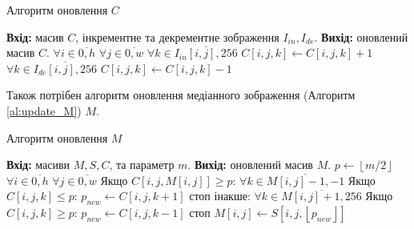 \begin{algorithm}[H]
    \caption{Алгоритм оновлення $C$}
    \begin{algorithmic}
        \State \textbf{Вхід:} масив $C$, інкрементне та декрементне зображення $I_{in}, I_{de}$.
        \State \textbf{Вихід:} оновлений масив $C$.
        \State $\forall i \in \overline{0,h}$
        \State \qquad  $\forall j \in \overline{0,w}$
        \State \qquad \qquad $\forall k \in \overline{I_{in}[i,j],256}$
        \State \qquad \qquad \qquad $C[i,j,k] \gets C[i,j,k] + 1$
        \State \qquad \qquad $\forall k \in \overline{I_{de}[i,j],256}$
        \State \qquad \qquad \qquad $C[i,j,k] \gets C[i,j,k] - 1$
    \end{algorithmic}
    \label{al:update_C}
\end{algorithm}

Також потрібен алгоритм оновлення медіанного зображення (Алгоритм \ref{al:update_M}) $M$.

\begin{algorithm}[H]
    \caption{Алгоритм оновлення $M$}
    \begin{algorithmic}
        \State \textbf{Вхід:} масиви $M, S, C$, та параметр $m$.
        \State \textbf{Вихід:} оновлений масив $M$.
        \State $p \gets \left\lfloor m/2 \right\rfloor$ 
        \State $\forall i \in \overline{0,h}$
        \State \qquad  $\forall j \in \overline{0,w}$
        \State \qquad \qquad  Якщо $C[i,j, M[i,j]] \geq p$:
        \State \qquad \qquad \qquad $\forall k \in \overline{M[i,j]-1,-1}$
        \State \qquad \qquad \qquad \qquad  Якщо $C[i,j,k] \leq p$:
        \State \qquad \qquad \qquad \qquad \qquad $p_{new} \gets C[i,j,k+1]$
        \State \qquad \qquad \qquad \qquad \qquad стоп
        \State \qquad \qquad інакше:
        \State \qquad \qquad \qquad $\forall k \in \overline{M[i,j]+1,256}$
        \State \qquad \qquad \qquad \qquad  Якщо $C[i,j,k] \geq p$:
        \State \qquad \qquad \qquad \qquad \qquad $p_{new} \gets C[i,j,k-1]$
        \State \qquad \qquad \qquad \qquad \qquad стоп
        \State \qquad \qquad $M[i,j] \gets S[i,j, \left\lfloor p_{new}\right\rfloor ]$
    \end{algorithmic}
    \label{al:update_M}
\end{algorithm}

